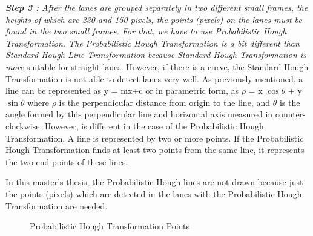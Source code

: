 \emph{\color{green}\textbf{Step 3 : }After the lanes are grouped separately in two different small frames, the heights of which are 230 and 150 pixels, the points (pixels) on the lanes must be found in the two small frames. For that, we have to use Probabilistic Hough Transformation. The Probabilistic Hough Transformation is a bit different than Standard Hough Line Transformation because Standard Hough Transformation is more} suitable for straight lanes. However, if there is a curve, the Standard Hough Transformation is not able to detect lanes very well. As previously mentioned, a line can be represented as y = mx+c or in parametric form, as $\rho$ = x $\cos \theta$ + y$ \sin \theta$ where  $\rho$ is the perpendicular distance from origin to the line, and $\theta$ is the angle formed by this perpendicular line and horizontal axis measured in counter-clockwise. However, is different in the case of the Probabilistic Hough Transformation. A line is represented by two or more points. If the Probabilistic Hough Transformation finds at least two points from the same line, it represents the two end points of these lines.

In this master's thesis, the Probabilistic Hough lines are not drawn because just the points (pixels) which are detected in the lanes with the Probabilistic Hough Transformation are needed. 


\begin{figure}[H]
  \centering
  \hfill
  \caption{Probabilistic Hough Transformation Points}
\end{figure} 
 
